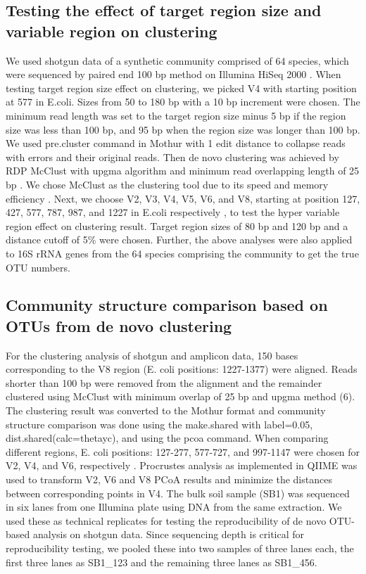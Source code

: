 \documentclass[]{msu-thesis}
\begin{document}
\subsection{Testing the effect of target region size and variable region on clustering}
We used shotgun data of a synthetic community comprised of 64 species, which were sequenced by paired end 100 bp method on Illumina HiSeq 2000 \cite{shakya_comparative_2013}. When testing target region size effect on clustering, we picked V4 with starting position at 577 in E.coli. Sizes from 50 to 180 bp with a 10 bp increment were chosen. The minimum read length was set to the target region size minus 5 bp if the region size was less than 100 bp, and 95 bp when the region size was longer than 100 bp. We used pre.cluster command in Mothur with 1 edit distance to collapse reads with errors and their original reads. Then de novo clustering was achieved by RDP McClust with upgma algorithm and minimum read overlapping length of 25 bp \cite{cole_ribosomal_2014}. We chose McClust as the clustering tool due to its speed and memory efficiency \cite{cole_ribosomal_2014,loewenstein_efficient_2008}. Next, we choose V2, V3, V4, V5, V6, and V8, starting at position 127, 427, 577, 787, 987, and 1227 in E.coli respectively \cite{neefs_compilation_1993}, to test the hyper variable region effect on clustering result. Target region sizes of 80 bp and 120 bp and a distance cutoff of 5\% were chosen. Further, the above analyses were also applied to 16S rRNA genes from the 64 species comprising the community to get the true OTU numbers.

\subsection{Community structure comparison based on OTUs from de novo clustering}
For the clustering analysis of shotgun and amplicon data, 150 bases corresponding to the V8 region (E. coli positions: 1227-1377) were aligned. Reads shorter than 100 bp were removed from the alignment and the remainder clustered using McClust with minimum overlap of 25 bp and upgma method (6). The clustering result was converted to the Mothur format and community structure comparison was done using the make.shared with label=0.05, dist.shared(calc=thetayc), and using the pcoa command. When comparing different regions, E. coli positions: 127-277, 577-727, and 997-1147 were chosen for V2, V4, and V6, respectively \cite{neefs_compilation_1993}. Procrustes analysis as implemented in QIIME was used to transform V2, V6 and V8 PCoA results and minimize the distances between corresponding points in V4. The bulk soil sample (SB1) was sequenced in six lanes from one Illumina plate using DNA from the same extraction. We used these as technical replicates for testing the reproducibility of de novo OTU-based analysis on shotgun data. Since sequencing depth is critical for reproducibility testing, we pooled these into two samples of three lanes each, the first three lanes as SB1\_123 and the remaining three lanes as SB1\_456.
\end{document}
